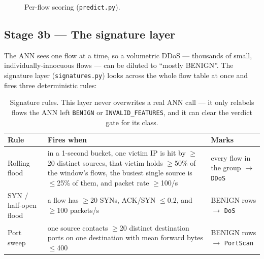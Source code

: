 \documentclass[11pt,a4paper]{article}
\begin{document}
\begin{figure}[H]\centering
{}
\caption{Per-flow scoring (\texttt{predict.py}).}
\end{figure}

\subsection{Stage 3b --- The signature layer}
The ANN sees one flow at a time, so a volumetric DDoS --- thousands of small,
individually-innocuous flows --- can be diluted to ``mostly BENIGN''. The
signature layer (\texttt{signatures.py}) looks across the whole flow table at
once and fires three deterministic rules:

\begin{table}[H]\centering\small
\begin{tabular}{@{}p{3cm}p{7.5cm}p{3.5cm}@{}}
\toprule
\textbf{Rule} & \textbf{Fires when} & \textbf{Marks} \\ \midrule
Rolling flood & in a 1-second bucket, one victim IP is hit by $\geq$20 distinct
  sources, that victim holds $\geq$50\% of the window's flows, the busiest single
  source is $\leq$25\% of them, and packet rate $\geq$100/s & every flow in the
  group $\rightarrow$ \texttt{DDoS} \\
SYN / half-open flood & a flow has $\geq$20 SYNs, ACK/SYN $\leq$0.2, and
  $\geq$100 packets/s & BENIGN rows $\rightarrow$ \texttt{DoS} \\
Port sweep & one source contacts $\geq$20 distinct destination ports on one
  destination with mean forward bytes $\leq$400 & BENIGN rows $\rightarrow$
  \texttt{PortScan} \\
\bottomrule
\end{tabular}
\caption{Signature rules. This layer never overwrites a real ANN call --- it
only relabels flows the ANN left \texttt{BENIGN} or \texttt{INVALID\_FEATURES},
and it can clear the verdict gate for its class.}
\end{table}
\end{document}
